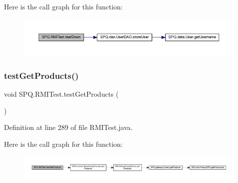 Here is the call graph for this function\+:
\nopagebreak
\begin{figure}[H]
\begin{center}
\leavevmode
\includegraphics[width=350pt]{class_s_p_q_1_1_r_m_i_test_a76a8f88205d4a70c8ed81ee03ab7fa45_cgraph}
\end{center}
\end{figure}
\mbox{\label{class_s_p_q_1_1_r_m_i_test_afd1616ccf97ef054e05f3ca90d22753e}} 
\subsubsection{\texorpdfstring{test\+Get\+Products()}{testGetProducts()}}
{\footnotesize\ttfamily void S\+P\+Q.\+R\+M\+I\+Test.\+test\+Get\+Products (\begin{DoxyParamCaption}{ }\end{DoxyParamCaption})}



Definition at line 289 of file R\+M\+I\+Test.\+java.

Here is the call graph for this function\+:
\nopagebreak
\begin{figure}[H]
\begin{center}
\leavevmode
\includegraphics[width=350pt]{class_s_p_q_1_1_r_m_i_test_afd1616ccf97ef054e05f3ca90d22753e_cgraph}
\end{center}
\end{figure}
\mbox{\label{class_s_p_q_1_1_r_m_i_test_a15a72e3572c99f10ba0ac5b0368f1a02}} 
